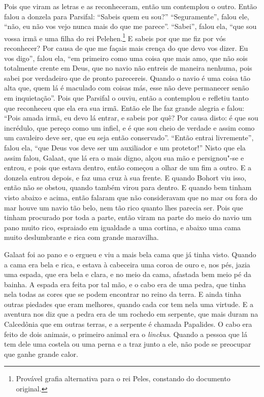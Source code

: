 Pois que viram as letras e as reconheceram, então um contemplou o outro. Então
falou a donzela para Parsifal: “Sabeis quem eu sou?” “Seguramente”, falou
ele, “não, eu não vos vejo nunca mais do que me parece”. “Sabei”, falou ela,
“que sou vossa irmã e uma filha do rei Pelehen.\footnote{ Provável grafia
alternativa para o rei Peles, constando do documento original.} E
sabeis por que me fiz por vós reconhecer? Por causa de que me façais mais
crença do que devo vos dizer. Eu vos digo”, falou ela, “em primeiro como uma
coisa que mais amo, que não sois totalmente crente em Deus, que no navio não
entreis de maneira nenhuma, pois sabei por verdadeiro que de pronto
parecereis. Quando o navio é uma coisa tão alta que, quem lá é maculado com
coisas más, esse não deve permanecer senão em inquietação”.
Pois que Parsifal o ouviu, então a contemplou e refletiu tanto que reconheceu
que ela era sua irmã. Então ele lhe faz grande alegria e falou: “Pois amada
irmã, eu devo lá entrar, e sabeis por quê? Por causa disto: é que sou
incrédulo, que pereço como um infiel, e é que sou cheio de verdade e assim como
um cavaleiro deve ser, que eu seja então conservado”. “Então entrai
livremente”, falou ela, “que Deus vos deve ser um auxiliador e um protetor!”
Nisto que ela assim falou, Galaat, que lá era o mais digno, alçou sua mão e
persignou"-se e entrou, e pois que estava dentro, então começou a olhar de um
fim a outro. E a donzela entrou depois, e faz uma cruz à sua frente. E quando
Bohort viu isso, então não se obstou, quando também virou para dentro. E quando
bem tinham visto abaixo e acima, então falaram que não consideravam que no mar
ou fora do mar houve um navio tão belo, nem tão rico quanto lhes parecia ser.
Pois que tinham procurado por toda a parte, então viram na parte do meio do
navio um pano muito rico, espraiado em igualdade a uma cortina, e abaixo uma
cama muito deslumbrante e rica com grande maravilha.

Galaat foi ao pano e o ergueu e viu a mais bela cama que já tinha visto. Quando
a cama era bela e rica, e estava à cabeceira uma coroa de ouro e, nos pés,
jazia uma espada, que era bela e clara, e no meio da cama, afastada bem meio pé
da bainha. A espada era feita por tal mão, e o cabo era de uma pedra, que tinha
nela todas as cores que se podem encontrar no reino da terra. E ainda tinha
outras piedades que eram melhores, quando cada cor tem nela uma virtude. E a
aventura nos diz que a pedra era de um rochedo em serpente, que mais duram na
Calcedônia que em outras terras, e a serpente é chamada Papalides. O
cabo era feito de dois animais, o primeiro animal era o \textit{linckus}.
Quando a pessoa que lá tem dele uma costela ou uma perna e a traz junto a ele,
não pode se preocupar que ganhe grande calor.

